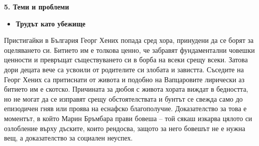 \documentclass[12pt,a4paper]{article}
\begin{document}
\vspace{0.1cm}
\textbf{5. Теми и проблеми}
\vspace{0.1cm}

\begin{itemize}[leftmargin=*, noitemsep, topsep=2pt, parsep=0pt]
    \item \textbf{Трудът като убежище}
\end{itemize}

\indent Пристигайки в България Георг Хених попада сред хора, принудени да се борят за оцеляването си. Битието им е толкова ценно, че забравят фундаментални човешки ценности и превръщат съществуването си в борба на всеки срещу всеки. Затова дори децата вече са усвоили от родителите си злобата и завистта. Съседите на Георг Хених са притиснати от живота и подобно на Вапцаровите лирически аз битието им е скотско. Причината за дюбоя с живота хората виждат в бедността, но не могат да се изправят срещу обстоятелствата и бунтът се свежда само до епизодичен гняв или проява на еснафско благополучие. Доказателство за това е моментът, в който Марин Бръмбара прави бовеша – той сякаш изкарва цялото си озлобление върху дъските, които рендосва, защото за него бовешът не е нужна вещ, а доказателство за социален неуспех.
\end{document}
